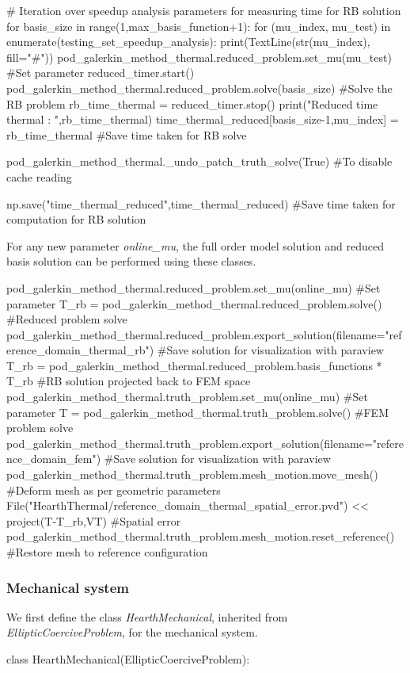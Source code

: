 \begin{python}
# Iteration over speedup analysis parameters for measuring time for RB solution
for basis_size in range(1,max_basis_function+1):
	for (mu_index, mu_test) in enumerate(testing_set_speedup_analysis):
		print(TextLine(str(mu_index), fill="#"))
		pod_galerkin_method_thermal.reduced_problem.set_mu(mu_test) #Set parameter
		reduced_timer.start()
		pod_galerkin_method_thermal.reduced_problem.solve(basis_size) #Solve the RB problem
		rb_time_thermal = reduced_timer.stop()
		print("Reduced time thermal : ",rb_time_thermal)
		time_thermal_reduced[basis_size-1,mu_index] = rb_time_thermal #Save time taken for RB solve

pod_galerkin_method_thermal._undo_patch_truth_solve(True) #To disable cache reading

np.save("time_thermal_reduced",time_thermal_reduced) #Save time taken for computation for RB solution
\end{python}

For any new parameter \emph{online\_mu}, the full order model solution and reduced basis solution can be performed using these classes.
\begin{python}
pod_galerkin_method_thermal.reduced_problem.set_mu(online_mu) #Set parameter
T_rb = pod_galerkin_method_thermal.reduced_problem.solve() #Reduced problem solve
pod_galerkin_method_thermal.reduced_problem.export_solution(filename="reference_domain_thermal_rb") #Save solution for visualization with paraview
T_rb = pod_galerkin_method_thermal.reduced_problem.basis_functions * T_rb #RB solution projected back to FEM space
pod_galerkin_method_thermal.truth_problem.set_mu(online_mu) #Set parameter
T = pod_galerkin_method_thermal.truth_problem.solve() #FEM problem solve
pod_galerkin_method_thermal.truth_problem.export_solution(filename="reference_domain_fem") #Save solution for visualization with paraview
pod_galerkin_method_thermal.truth_problem.mesh_motion.move_mesh() #Deform mesh as per geometric parameters
File("HearthThermal/reference_domain_thermal_spatial_error.pvd") << project(T-T_rb,VT) #Spatial error
pod_galerkin_method_thermal.truth_problem.mesh_motion.reset_reference() #Restore mesh to reference configuration
\end{python}

\subsubsection{Mechanical system}

We first define the class \emph{HearthMechanical}, inherited from \emph{EllipticCoerciveProblem}, for the mechanical system.
\begin{python}
class HearthMechanical(EllipticCoerciveProblem):
\end{python}

